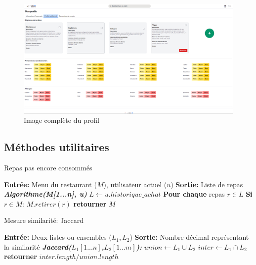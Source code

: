 \documentclass[11pt]{article}
\begin{document}
\begin{figure}[H]
\includegraphics[scale=0.35]{images/full_profile.png}
\caption{Image complète du profil}
\end{figure}
 

\subsection*{Méthodes utilitaires}
\label{annexe}
\begin{algorithm}[H]
    \caption{Repas pas encore consommés}
    \begin{algorithmic}[1]
    \Statex \textbf{Entrée:} Menu du restaurant ($M$), utilisateur actuel ($u$)
    \Statex \textbf{Sortie:} Liste de repas
    \State \textbf{\textit{Algorithme(M[1...n], u)}}
    \State \hspace{0.5cm} $L \leftarrow u.historique\_achat$
    \State \hspace{0.5cm} \textbf{Pour chaque} repas $r \in L$
    \State \hspace{1cm} \textbf{Si} $r \in M$:
    \State \hspace{1.5cm} $M.retirer(r)$
    \State \hspace{0.5cm} \textbf{retourner} $M$
    \end{algorithmic}
\end{algorithm}

\begin{algorithm}[H]
    \caption{Mesure similarité: Jaccard}
    \begin{algorithmic}[1]
    \Statex \textbf{Entrée:} Deux listes ou ensembles ($L_1, L_2$)
    \Statex \textbf{Sortie:} Nombre décimal représentant la similarité
    \State \textbf{\textit{Jaccard($L_1[1...n]$,$L_2[1...m]$):}}
    \State \hspace{0.5cm} $union \leftarrow L_1 \cup L_2$
    \State \hspace{0.5cm} $inter \leftarrow L_1 \cap L_2$
    \State \hspace{0.5cm} \textbf{retourner} $inter.length/union.length$
    \end{algorithmic}
\end{algorithm}
\end{document}
